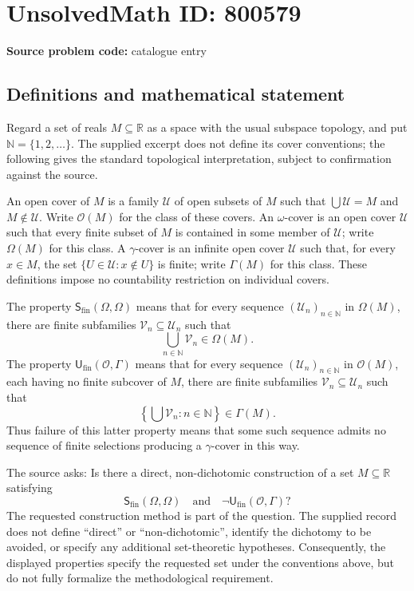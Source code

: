 \documentclass[11pt]{article}
\newcommand{\N}{\mathbb{N}}
\newcommand{\R}{\mathbb{R}}
\begin{document}
\section*{UnsolvedMath ID: 800579}
\textbf{Source problem code:} catalogue entry
\subsection{Definitions and mathematical statement}
Regard a set of reals \(M\subseteq\R\) as a space with the usual subspace topology, and put \(\N=\{1,2,\ldots\}\). The supplied excerpt does not define its cover conventions; the following gives the standard topological interpretation, subject to confirmation against the source.

An open cover of \(M\) is a family \(\mathcal U\) of open subsets of \(M\) such that \(\bigcup\mathcal U=M\) and \(M\notin\mathcal U\). Write \(\mathcal O(M)\) for the class of these covers. An \(\omega\)-cover is an open cover \(\mathcal U\) such that every finite subset of \(M\) is contained in some member of \(\mathcal U\); write \(\Omega(M)\) for this class. A \(\gamma\)-cover is an infinite open cover \(\mathcal U\) such that, for every \(x\in M\), the set \(\{U\in\mathcal U:x\notin U\}\) is finite; write \(\Gamma(M)\) for this class. These definitions impose no countability restriction on individual covers.

The property \(\mathsf S_{\mathrm{fin}}(\Omega,\Omega)\) means that for every sequence \((\mathcal U_n)_{n\in\N}\) in \(\Omega(M)\), there are finite subfamilies \(\mathcal V_n\subseteq\mathcal U_n\) such that
\[
\bigcup_{n\in\N}\mathcal V_n\in\Omega(M).
\]
The property \(\mathsf U_{\mathrm{fin}}(\mathcal O,\Gamma)\) means that for every sequence \((\mathcal U_n)_{n\in\N}\) in \(\mathcal O(M)\), each having no finite subcover of \(M\), there are finite subfamilies \(\mathcal V_n\subseteq\mathcal U_n\) such that
\[
\left\{\bigcup\mathcal V_n:n\in\N\right\}\in\Gamma(M).
\]
Thus failure of this latter property means that some such sequence admits no sequence of finite selections producing a \(\gamma\)-cover in this way.

The source asks: Is there a direct, non-dichotomic construction of a set \(M\subseteq\R\) satisfying
\[
\mathsf S_{\mathrm{fin}}(\Omega,\Omega)
\quad\text{and}\quad
\neg\mathsf U_{\mathrm{fin}}(\mathcal O,\Gamma)?
\]
The requested construction method is part of the question. The supplied record does not define ``direct'' or ``non-dichotomic'', identify the dichotomy to be avoided, or specify any additional set-theoretic hypotheses. Consequently, the displayed properties specify the requested set under the conventions above, but do not fully formalize the methodological requirement.
\end{document}
